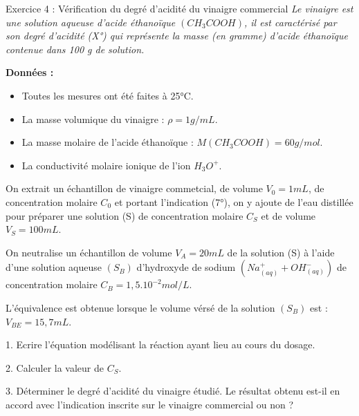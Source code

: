 \documentclass[12pt, french]{article}
\begin{document}
\begin{Box2}{Exercice 4 : Vérification du degré d’acidité du vinaigre commercial }
\emph{Le vinaigre est une solution aqueuse d’acide éthanoïque $(CH_3COOH)$, il est
caractérisé par son degré d’acidité (X°) qui représente la masse (en gramme)
d’acide éthanoïque contenue dans 100 g de solution.}

\textbf{Données :}

\begin{itemize}

	\item Toutes les mesures ont été faites à 25°C.
	\item La masse volumique du vinaigre : $\rho = 1 g/mL$.
	\item La masse molaire de l’acide éthanoïque : $M(CH_3COOH) = 60 g/mol$.
	\item La conductivité molaire ionique de l’ion $H_3O^+ $.

\end{itemize}
On extrait un échantillon de vinaigre commetcial, de volume $V_0 = 1 mL$, de
concentration molaire $C_0$ et portant l’indication (7°), on y ajoute de l’eau distillée
pour préparer une solution (S) de concentration molaire $C_S$ et de volume $V_S = 100 mL$.

On neutralise un échantillon de volume $V_A= 20 mL$ de la solution (S) à l’aide d’une
solution aqueuse $(S_B)$ d’hydroxyde de sodium $(Na^+_{(aq)} + OH^-_{(aq)})$ de concentration molaire $C_B = 1,5.10^{-2} mol/L$.

L’équivalence est obtenue lorsque le volume vérsé de la solution $(S_B)$ est : $V_{BE} = 15,7 mL$.

1. Ecrire l’équation modélisant la réaction ayant lieu au cours du dosage.

2. Calculer la valeur de $C_S$.

3. Déterminer le degré d’acidité du vinaigre étudié. Le résultat obtenu est-il en accord avec l’indication inscrite sur le vinaigre commercial ou non ?

\end{Box2}
\end{document}
